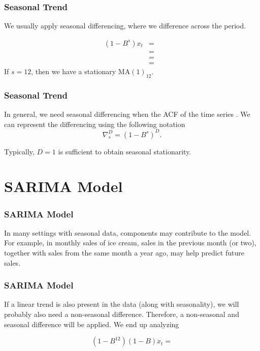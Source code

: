 \documentclass[%
xcolor=pdftex]{beamer}
\begin{document}
\begin{frame}
\frametitle{Seasonal Trend}

We usually apply seasonal differencing, where we difference across the period.

\begin{eqnarray*}
(1-B^s)x_t &=& \nonumber \\
           &=& \nonumber \\
           &=& \nonumber \\
           &=& 
\end{eqnarray*}
If $s=12$, then we have a stationary MA$(1)_{12}$.

\end{frame}

\begin{frame}
\frametitle{Seasonal Trend}

In general, we need seasonal differencing when the ACF of the time series \underline{\hspace{55 mm}}. We can represent the differencing using the following notation
$$
\nabla_s^D=(1-B^s)^D.
$$

Typically, $D=1$ is sufficient to obtain seasonal stationarity. %

\end{frame}

\section{SARIMA Model}
\frame{\tableofcontents[currentsection]}

\begin{frame}
\frametitle{SARIMA Model}

In many settings with seasonal data, \underline{\hspace{25 mm}} components may contribute to the model. For example, in monthly sales of ice cream, sales in the previous month (or two), together with sales from the same month a year ago, may help predict future sales.

\end{frame}


\begin{frame}
\frametitle{SARIMA Model}

If a linear trend is also present in the data (along with seasonality), we will probably also need a non-seasonal difference. Therefore, a non-seasonal and seasonal difference will be applied. We end up analyzing

$$
(1-B^{12})(1-B)x_t =
$$

\end{frame}
\end{document}
